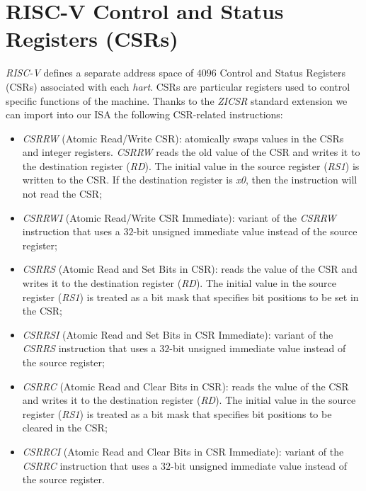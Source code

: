 \section{RISC-V Control and Status Registers (CSRs)}
\label{sec:riscv_csrs}

\textit{RISC-V} defines a separate address space of $4096$ Control and Status
Registers (CSRs) associated with each \textit{hart}. CSRs are particular
registers used to control specific functions of the machine. Thanks to the \textit{ZICSR}
standard extension we can import into our ISA the following CSR-related
instructions:
\begin{itemize}
  \item \textit{CSRRW} (Atomic Read/Write CSR): atomically swaps values in the CSRs
    and integer registers. \textit{CSRRW} reads the old value of the CSR and writes
    it to the destination register (\textit{RD}). The initial value in the source
    register (\textit{RS1}) is written to the CSR. If the destination register is
    \textit{x0}, then the instruction will not read the CSR;

  \item \textit{CSRRWI} (Atomic Read/Write CSR Immediate): variant of the \textit{CSRRW}
    instruction that uses a $32$-bit unsigned immediate value instead of the
    source register;

  \item \textit{CSRRS} (Atomic Read and Set Bits in CSR): reads the value of the
    CSR and writes it to the destination register (\textit{RD}). The initial value
    in the source register (\textit{RS1}) is treated as a bit mask that
    specifies bit positions to be set in the CSR;

  \item \textit{CSRRSI} (Atomic Read and Set Bits in CSR Immediate): variant of the
    \textit{CSRRS} instruction that uses a $32$-bit unsigned immediate value
    instead of the source register;

  \item \textit{CSRRC} (Atomic Read and Clear Bits in CSR): reads the value of the
    CSR and writes it to the destination register (\textit{RD}). The initial value
    in the source register (\textit{RS1}) is treated as a bit mask that
    specifies bit positions to be cleared in the CSR;

  \item \textit{CSRRCI} (Atomic Read and Clear Bits in CSR Immediate): variant of
    the \textit{CSRRC} instruction that uses a $32$-bit unsigned immediate value
    instead of the source register.
\end{itemize}

